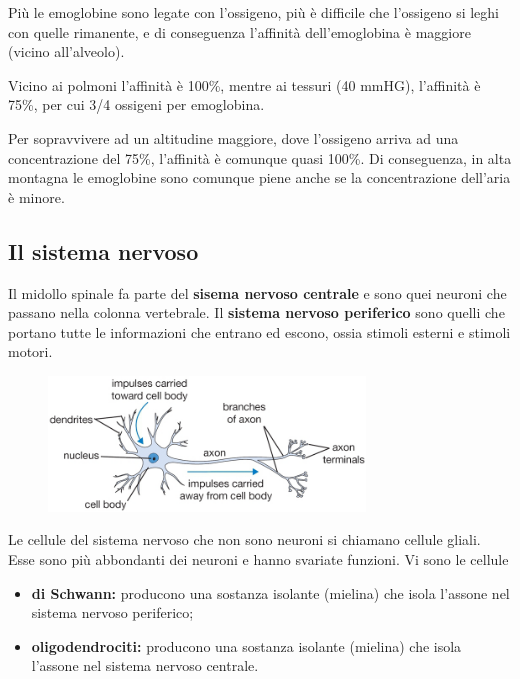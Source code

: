 \documentclass[a4paper]{article}
\begin{document}
Più le emoglobine sono legate con l'ossigeno, più è difficile che l'ossigeno si leghi con quelle rimanente,
e di conseguenza l'affinità dell'emoglobina è maggiore (vicino all'alveolo).

Vicino ai polmoni l'affinità è 100\%, mentre ai tessuri (40 mmHG), l'affinità è 75\%, per
cui 3/4 ossigeni per emoglobina.

Per sopravvivere ad un altitudine maggiore, dove l'ossigeno arriva ad una concentrazione del
75\%, l'affinità è comunque quasi 100\%. Di conseguenza, in alta montagna le emoglobine sono comunque
piene anche se la concentrazione dell'aria è minore.

\pagebreak

\subsection{Il sistema nervoso}


Il midollo spinale fa parte del \textbf{sisema nervoso centrale} e sono quei neuroni
che passano nella colonna vertebrale.
Il \textbf{sistema nervoso periferico} sono quelli che portano tutte le informazioni che entrano
ed escono, ossia stimoli esterni e stimoli motori.

\begin{figure}[ht]
    \centering
    \includegraphics[width=0.75\textwidth]{./neuron.png}
\end{figure}

Le cellule del sistema nervoso che non sono neuroni si chiamano cellule gliali.
Esse sono più abbondanti dei neuroni e hanno svariate funzioni.
Vi sono le cellule
\begin{itemize}
    \item \textbf{di Schwann:} producono una sostanza isolante (mielina) che isola l'assone nel sistema nervoso periferico;
    \item \textbf{oligodendrociti:} producono una sostanza isolante (mielina) che isola l'assone nel sistema nervoso centrale.
\end{itemize}
\end{document}
